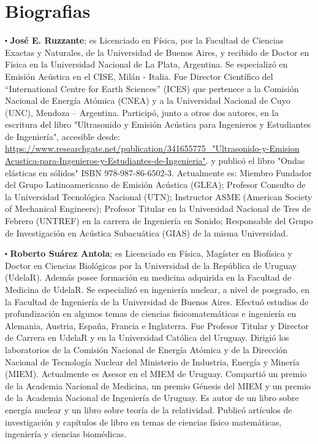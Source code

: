 \documentclass[
11pt, %
spanish,
singlespacing, %
parskip, %
headsepline, %
]{MastersDoctoralThesis} %
\begin{document}
\vspace{10mm}




\chapter*{Biografias}

\begin{sloppypar}


$\centerdot$ \textbf{José E. Ruzzante}; es Licenciado en Física, por la Facultad de Ciencias Exactas y Naturales, de la Universidad de Buenos Aires, y recibido de Doctor en Física en la Universidad Nacional de La Plata, Argentina. Se especializó en Emisión Acústica en el CISE, Milán - Italia. Fue Director Científico del “International Centre for Earth Sciences” (ICES) que pertenece a la Comisión Nacional de Energía Atómica (CNEA) y a la Universidad Nacional de Cuyo (UNC), Mendoza – Argentina. Participó, junto a otros dos autores, en la escritura del libro "Ultrasonido y Emisión Acústica para Ingenieros y Estudiantes de Ingeniería", accesible desde: \url{https://www.researchgate.net/publication/341655775_"Ultrasonido-y-Emision Acustica-para-Ingenieros-y-Estudiantes-de-Ingenieria"}. y publicó el libro "Ondas elásticas en sólidos" ISBN 978-987-86-6502-3.
 Actualmente es:  Miembro Fundador del Grupo Latinoamericano de Emisión Acústica (GLEA);  Profesor Consulto de la Universidad Tecnológica Nacional (UTN);  Instructor ASME (American Society of Mechanical Engineers); Profesor Titular en la Universidad Nacional de Tres de Febrero (UNTREF) en la carrera de Ingeniería en Sonido;  Responsable del Grupo de Investigación en Acústica Subacuática (GIAS) de la misma Universidad.
 
$\centerdot$ \textbf{Roberto Suárez Antola}; es Licenciado en Física, Magíster en Biofísica y Doctor en Ciencias Biológicas por la Universidad de la República de Uruguay (UdelaR).  Además posee formación en medicina adquirida en la Facultad de Medicina de UdelaR. Se especializó en ingeniería nuclear, a nivel de posgrado, en la Facultad de Ingeniería de la Universidad de Buenos Aires. Efectuó estudios de profundización en algunos temas de ciencias fisicomatemáticas e ingeniería en Alemania, Austria, España, Francia e Inglaterra.
Fue Profesor Titular y Director de Carrera en UdelaR y en la Universidad Católica del Uruguay. Dirigió los laboratorios de la Comisión Nacional de Energía Atómica y de la Dirección Nacional de Tecnología Nuclear del Ministerio de Industria, Energía y Minería (MIEM). Actualmente es Asesor en el MIEM de Uruguay. Compartió un premio de la Academia Nacional de Medicina, un premio Génesis del MIEM y un premio de la Academia Nacional de Ingeniería de Uruguay. Es autor de un libro sobre energía nuclear y un libro sobre teoría de la relatividad. Publicó artículos de investigación y capítulos de libro en temas de ciencias físico matemáticas, ingeniería y ciencias biomédicas.


\end{sloppypar}
\end{document}
